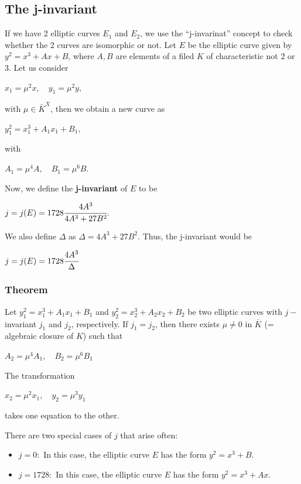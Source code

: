 \documentclass[a4paper, 12pt]{article}
\begin{document}
\subsection{The j-invariant}
If we have 2 elliptic curves $E_1$ and $E_2$, we use the ``j-invarinat'' concept to check whether the 2 curves are isomorphic or not. \newline Let $E$ be the elliptic curve given by $y^2=x^3+Ax+B$, where $A, B$ are elements of a filed $K$ of characteristic not 2 or 3. Let us consider 
\begin{center} $x_1 = \mu^2x,\quad y_1=\mu^2 y, $ \end{center}
with $\mu \in {\bar{K}}^X$, then we obtain a new curve as
\begin{center} $y_1^2 = x_1^3+A_1x_1+B_1,$ \end{center}
with \begin{center} $A_1 = \mu^4A,\quad B_1=\mu^6B.$ \end{center}
Now, we define the \textbf{j-invariant} of $E$ to be
\begin{center} $j = j(E) = 1728\cfrac{4A^3}{4A^3+27B^2}.$ \end{center}
We also define $\Delta$ as $\Delta = 4A^3+27B^2$. Thus, the j-invariant would be
\begin{center} $j = j(E) = 1728\cfrac{4A^3}{\Delta}$ \end{center}
\subsubsection {Theorem}
Let $y_1^2 = x_1^3 + A_1x_1+B_1$ and $y_2^2 = x_2^3 + A_2x_2+B_2$ be two elliptic curves with $j-$invariant $j_1$ and $j_2$, respectively. If $j_1 = j_2$, then there exists $\mu \neq 0$ in $\bar{K}$ (= algebraic closure of $K$) such that
\begin{center} $A_2 = \mu^4A_1, \quad B_2=\mu^6B_1$ \end{center}
The transformation
\begin{center} $x_2=\mu^2x_1,\quad y_2=\mu^3y_1$ \end{center}
takes one equation to the other.\par
There are two special cases of $j$ that arise often:
\begin{itemize}
	\item $j=0:$ In this case, the elliptic curve $E$ has the form $y^2=x^3 +B.$
	\item $j=1728:$ In this case, the elliptic curve $E$ has the form $y^2=x^3+Ax.$
\end{itemize}
\end{document}
